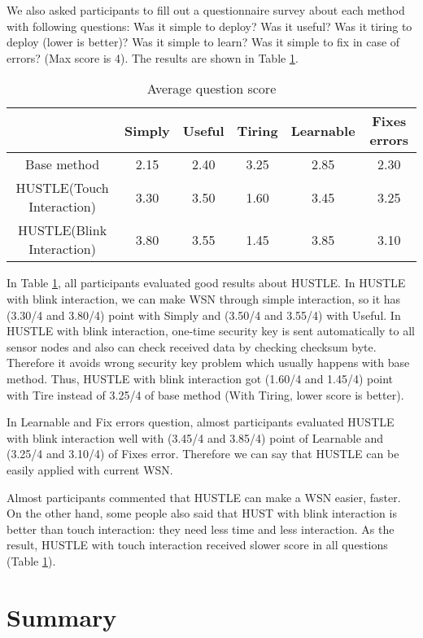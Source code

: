 We also asked participants to fill out a questionnaire survey about each method with following questions: Was it simple to deploy? Was it useful? Was it tiring to deploy (lower is better)? Was it simple to learn? Was it simple to fix in case of errors? (Max score is 4). The results are shown in Table \ref{tab:evaluation_result_score}.

\begin{table}[htdp]
\centering
\caption{ Average question score}
\begin{tabular}{ | c | c | c | c | c | c|}
 \hline
 &Simply & Useful & Tiring & Learnable & Fixes errors \\
 \hline
 Base method & 2.15 & 2.40 & 3.25 & 2.85 & 2.30 \\
 \hline
 HUSTLE(Touch Interaction) & 3.30 & 3.50 & 1.60 & 3.45 & 3.25 \\
 \hline
 HUSTLE(Blink Interaction) & 3.80 & 3.55 & 1.45 & 3.85 & 3.10 \\
 \hline
\end{tabular}
\label{tab:evaluation_result_score}
\end{table}

In Table \ref{tab:evaluation_result_score}, all participants evaluated good results about HUSTLE. In HUSTLE with blink interaction, we can make WSN through simple interaction, so it has (3.30/4 and 3.80/4) point with Simply and (3.50/4 and 3.55/4) with Useful. In HUSTLE with blink interaction, one-time security key is sent automatically to all sensor nodes and also can check received data by checking checksum byte. Therefore it avoids wrong security key problem which usually happens with base method. Thus, HUSTLE with blink interaction got (1.60/4 and 1.45/4) point with Tire instead of 3.25/4 of base method (With Tiring, lower score is better).

In Learnable and Fix errors question, almost participants evaluated HUSTLE with blink interaction well with (3.45/4 and 3.85/4) point of Learnable and (3.25/4 and 3.10/4) of Fixes error. Therefore we can say that HUSTLE can be easily applied with current WSN.

Almost participants commented that HUSTLE can make a WSN easier, faster. On the other hand, some people also said that HUST with blink interaction is better than touch interaction: they need less time and less interaction. As the result, HUSTLE with touch interaction received slower score in all questions (Table \ref{tab:evaluation_result_score}).

\section{Summary}\label{sec:evaluation_summary}

